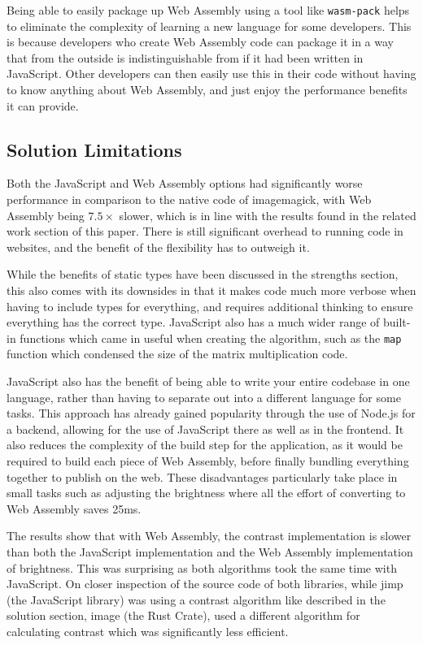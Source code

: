 \documentclass[12pt,a4paper]{article}
\begin{document}
Being able to easily package up Web Assembly using a tool like \texttt{wasm-pack} helps to eliminate the complexity of learning a new language for some developers. This is because developers who create Web Assembly code can package it in a way that from the outside is indistinguishable from if it had been written in JavaScript. Other developers can then easily use this in their code without having to know anything about Web Assembly, and just enjoy the performance benefits it can provide.




\subsection{Solution Limitations}

Both the JavaScript and Web Assembly options had significantly worse performance in comparison to the native code of imagemagick, with Web Assembly being $7.5 \times$ slower, which is in line with the results found in the related work section of this paper. There is still significant overhead to running code in websites, and the benefit of the flexibility has to outweigh it.

While the benefits of static types have been discussed in the strengths section, this also comes with its downsides in that it makes code much more verbose when having to include types for everything, and requires additional thinking to ensure everything has the correct type. JavaScript also has a much wider range of built-in functions which came in useful when creating the algorithm, such as the \texttt{map} function which condensed the size of the matrix multiplication code.

JavaScript also has the benefit of being able to write your entire codebase in one language, rather than having to separate out into a different language for some tasks. This approach has already gained popularity through the use of Node.js for a backend, allowing for the use of JavaScript there as well as in the frontend. It also reduces the complexity of the build step for the application, as it would be required to build each piece of Web Assembly, before finally bundling everything together to publish on the web. These disadvantages particularly take place in small tasks such as adjusting the brightness where all the effort of converting to Web Assembly saves 25ms.

The results show that with Web Assembly, the contrast implementation is slower than both the JavaScript implementation and the Web Assembly implementation of brightness. This was surprising as both algorithms took the same time with JavaScript. On closer inspection of the source code of both libraries, while jimp (the JavaScript library) was using a contrast algorithm like described in the solution section, image (the Rust Crate), used a different algorithm for calculating contrast which was significantly less efficient.
\end{document}
